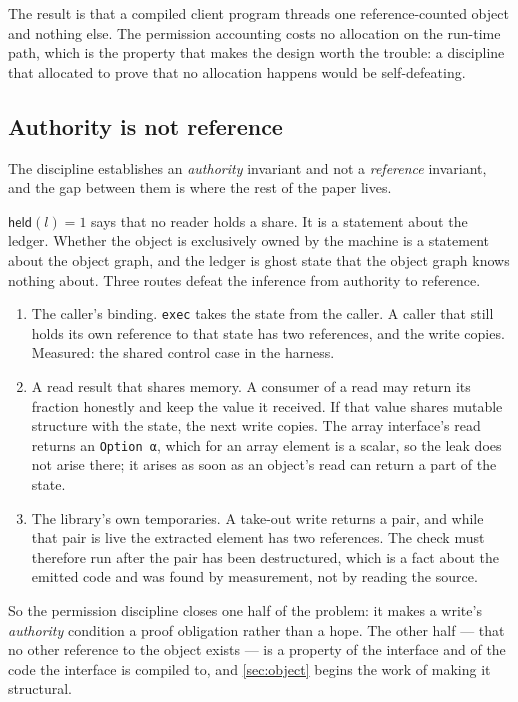 \documentclass[11pt,a4paper]{article}
\theoremstyle{definition}
\theoremstyle{plain}
\newcommand{\held}{\mathsf{held}}
\newcommand{\code}[1]{\texttt{#1}}
\begin{document}
The result is that a compiled client program threads one reference-counted
object and nothing else. The permission accounting costs no allocation on the
run-time path, which is the property that makes the design worth the trouble: a
discipline that allocated to prove that no allocation happens would be
self-defeating.

\subsection{Authority is not reference}\label{sec:gap}

The discipline establishes an \emph{authority} invariant and not a
\emph{reference} invariant, and the gap between them is where the rest of the
paper lives.

$\held(l) = 1$ says that no reader holds a share. It is a statement about the
ledger. Whether the object is exclusively owned by the machine is a statement
about the object graph, and the ledger is ghost state that the object graph
knows nothing about. Three routes defeat the inference from authority to
reference.

\begin{enumerate}[leftmargin=1.4em,itemsep=2pt]
\item The caller's binding. \code{exec} takes the state from the caller. A
caller that still holds its own reference to that state has two references, and
the write copies. Measured: the shared control case in the harness.
\item A read result that shares memory. A consumer of a read may return its
fraction honestly and keep the value it received. If that value shares mutable
structure with the state, the next write copies. The array interface's read
returns an \code{Option α}, which for an array element is a scalar, so the leak
does not arise there; it arises as soon as an object's read can return a part of
the state.
\item The library's own temporaries. A take-out write returns a pair, and while
that pair is live the extracted element has two references. The check must
therefore run after the pair has been destructured, which is a fact about the
emitted code and was found by measurement, not by reading the source.
\end{enumerate}

So the permission discipline closes one half of the problem: it makes a write's
\emph{authority} condition a proof obligation rather than a hope. The other
half --- that no other reference to the object exists --- is a property of the
interface and of the code the interface is compiled to, and \cref{sec:object}
begins the work of making it structural.
\end{document}
